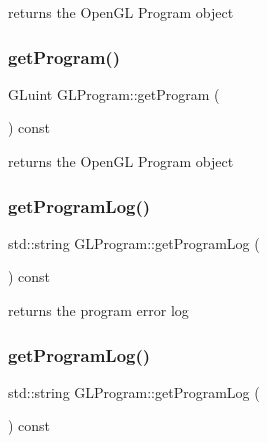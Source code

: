 returns the Open\+GL Program object \mbox{\label{classGLProgram_a02a4cfcbcf881d3f6c83dac6861e6743}} 
\subsubsection{\texorpdfstring{get\+Program()}{getProgram()}\hspace{0.1cm}{\footnotesize\ttfamily [2/2]}}
{\footnotesize\ttfamily G\+Luint G\+L\+Program\+::get\+Program (\begin{DoxyParamCaption}{ }\end{DoxyParamCaption}) const\hspace{0.3cm}{\ttfamily [inline]}}

returns the Open\+GL Program object \mbox{\label{classGLProgram_a1397791d58a20f927a5e101b20646d22}} 
\subsubsection{\texorpdfstring{get\+Program\+Log()}{getProgramLog()}\hspace{0.1cm}{\footnotesize\ttfamily [1/2]}}
{\footnotesize\ttfamily std\+::string G\+L\+Program\+::get\+Program\+Log (\begin{DoxyParamCaption}{ }\end{DoxyParamCaption}) const}

returns the program error log \mbox{\label{classGLProgram_a1397791d58a20f927a5e101b20646d22}} 
\subsubsection{\texorpdfstring{get\+Program\+Log()}{getProgramLog()}\hspace{0.1cm}{\footnotesize\ttfamily [2/2]}}
{\footnotesize\ttfamily std\+::string G\+L\+Program\+::get\+Program\+Log (\begin{DoxyParamCaption}{ }\end{DoxyParamCaption}) const}

